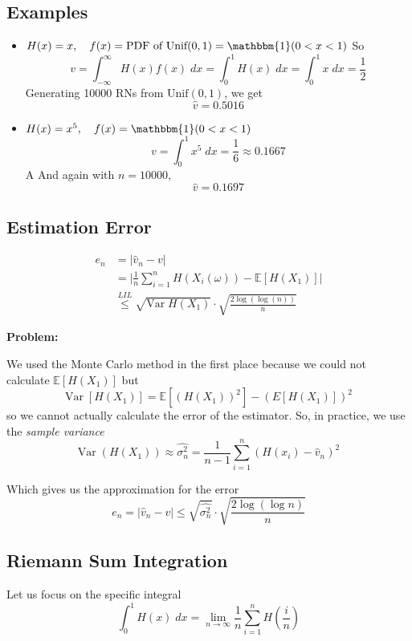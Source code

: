 \documentclass[12pt]{article}
\renewcommand{\hat}[1]{\widehat{#1}}
\newcommand{\E}{\mathbb{E}}
\newcommand{\ind}{\mathbbm{1}}
\newcommand{\Var}{\text{Var}\;}
\begin{document}
\subsection{Examples}
\begin{itemize}
    \item $H(x) = x, \quad f(x) = \text{PDF of Unif}(0, 1) = \ind(0 < x < 1)$
    So 
    \[v = \int_{-\infty}^{\infty} H(x) f(x)\; dx = \int_0^1 H(x)\; dx = \int_0^1 x\; dx = \frac{1}{2}\]
    Generating 10000 RNs from $\text{Unif}(0, 1)$, we get 
    \[\hat v = 0.5016\]

    \item $H(x) = x^5, \quad f(x) = \ind(0 < x < 1)$
    \[v = \int_0^1 x^5 \; dx = \frac{1}{6} \approx 0.1667\]A
    And again with $n = 10000$,
    \[\hat v = 0.1697\]
\end{itemize}

\subsection{Estimation Error}
\begin{align*}
    e_n &= \big\vert \hat v_n - v\big\vert\\
    &= \bigg\vert \frac{1}{n}\sum_{i=1}^n H(X_i(\omega)) - \E[H(X_1)] \bigg\vert\\
    &\overset{LIL}{\leq} \sqrt{\Var H(X_1)} \cdot \sqrt{\frac{2\log(\log(n))}{n}}
\end{align*}

\vspace*{0.25in}

\textbf{Problem:} 

We used the Monte Carlo method in the first place because we could not calculate $\E[H(X_1)]$ but
\[\Var[H(X_1)] = \E[(H(X_1))^2] - (E[H(X_1)])^2\]
so we cannot actually calculate the error of the estimator. So, in practice, we use the \emph{sample variance}
\[\Var(H(X_1)) \approx \widehat{\sigma_n^2} = \frac{1}{n - 1} \sum_{i=1}^n\left(H(x_i) - \hat v_n\right)^2\]

Which gives us the approximation for the error
\[e_n = \big\vert \hat v_n - v \big\vert \leq \sqrt{\widehat{\sigma_n^2}} \cdot \sqrt{\frac{2\log(\log n)}{n}}\]

\subsection{Riemann Sum Integration}
Let us focus on the specific integral
\[\int_0^1 H(x)\; dx = \lim_{n\to\infty} \frac{1}{n}\sum_{i=1}^n H(\frac{i}{n})\]
\end{document}
